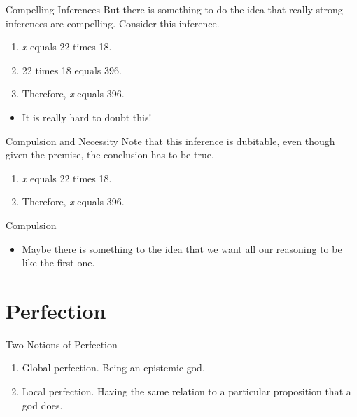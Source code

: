 \documentclass[
  17pt,
  letterpaper,
  ignorenonframetext,
  aspectratio=169,
]{beamer}
\providecommand{\tightlist}{%
  \setlength{\itemsep}{0pt}\setlength{\parskip}{0pt}}\usepackage{longtable,booktabs,array}
\begin{document}
\begin{frame}{Compelling Inferences}
\protect\hypertarget{compelling-inferences}{}
But there is something to do the idea that really strong inferences are
compelling. Consider this inference.

\begin{enumerate}[<+->]
\tightlist
\item
  \emph{x} equals 22 times 18.
\item
  22 times 18 equals 396.
\item
  Therefore, \emph{x} equals 396.
\end{enumerate}

\begin{itemize}[<+->]
\tightlist
\item
  It is really hard to doubt this!
\end{itemize}
\end{frame}

\begin{frame}{Compulsion and Necessity}
\protect\hypertarget{compulsion-and-necessity}{}
Note that this inference is dubitable, even though given the premise,
the conclusion has to be true.

\begin{enumerate}[<+->]
\tightlist
\item
  \emph{x} equals 22 times 18.
\item
  Therefore, \emph{x} equals 396.
\end{enumerate}
\end{frame}

\begin{frame}{Compulsion}
\protect\hypertarget{compulsion-4}{}
\begin{itemize}[<+->]
\tightlist
\item
  Maybe there is something to the idea that we want all our reasoning to
  be like the first one.
\end{itemize}
\end{frame}

\hypertarget{perfection}{%
\section{Perfection}\label{perfection}}

\begin{frame}{Two Notions of Perfection}
\protect\hypertarget{two-notions-of-perfection}{}
\begin{enumerate}[<+->]
\tightlist
\item
  Global perfection. Being an epistemic god.
\item
  Local perfection. Having the same relation to a particular proposition
  that a god does.
\end{enumerate}
\end{frame}
\end{document}
